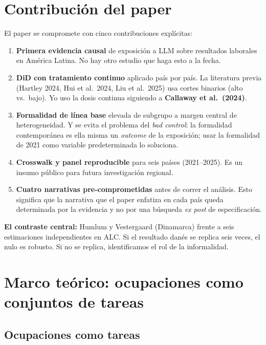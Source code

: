 \documentclass[12pt]{article}
\begin{document}
\section{Contribución del paper}

El paper se compromete con cinco contribuciones explícitas:

\begin{enumerate}
  \item \textbf{Primera evidencia causal} de exposición a LLM sobre resultados laborales en América Latina. No hay otro estudio que haga esto a la fecha.
  \item \textbf{DiD con tratamiento continuo} aplicado país por país. La literatura previa (Hartley 2024, Hui et al.\ 2024, Liu et al.\ 2025) usa cortes binarios (alto vs.\ bajo). Yo uso la dosis continua siguiendo a \textbf{Callaway et al.\ (2024)}.
  \item \textbf{Formalidad de línea base} elevada de subgrupo a margen central de heterogeneidad. Y se evita el problema del \emph{bad control}: la formalidad contemporánea es ella misma un \emph{outcome} de la exposición; usar la formalidad de 2021 como variable predeterminada lo soluciona.
  \item \textbf{Crosswalk y panel reproducible} para seis países (2021--2025). Es un insumo público para futura investigación regional.
  \item \textbf{Cuatro narrativas pre-comprometidas} antes de correr el análisis. Esto significa que la narrativa que el paper enfatiza en cada país queda determinada por la evidencia y no por una búsqueda \emph{ex post} de especificación.
\end{enumerate}

\textbf{El contraste central:} Humlum y Vestergaard (Dinamarca) frente a seis estimaciones independientes en ALC. Si el resultado danés se replica seis veces, el nulo es robusto. Si no se replica, identificamos el rol de la informalidad.

\section{Marco teórico: ocupaciones como conjuntos de tareas}

\subsection{Ocupaciones como tareas}
\end{document}
